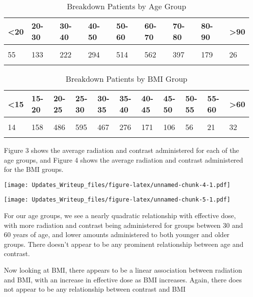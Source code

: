 \documentclass[]{article}
\begin{document}
\begin{table}[H] \centering 
  \caption{Breakdown Patients by Age Group} 
\begin{tabular}{p{1cm}p{1cm}p{1cm}p{1cm}p{1cm}p{1cm}p{1cm}p{1cm}p{1cm}}
\\[-1.8ex] \hline 
\hline
 <20 & 20-30 & 30-40 & 40-50& 50-60 & 60-70 & 70-80 & 80-90 & >90 \\ 
 \hline \\[-1.8ex] 
55 & 133 & 222 & 294 & 514 & 562 & 397 & 179 & 26 \\
\hline 
\hline \\[-1.8ex]
 \end{tabular}
\end{table}

\begin{table}[H] \centering 
  \caption{Breakdown Patients by BMI Group} 
\begin{tabular}{p{1cm}p{1cm}p{1cm}p{1cm}p{1cm}p{1cm}p{1cm}p{1cm}p{1cm}p{1cm}p{1cm}}
\\[-1.8ex] \hline 
\hline
 <15 & 15-20 & 20-25 & 25-30 & 30-35 & 35-40 & 40-45 & 45-50 & 50-55 & 55-60 & >60 \\ 
 \hline \\[-1.8ex] 
14 & 158 & 486 & 595 & 467 & 276 & 171 & 106 & 56 & 21 & 32 \\
\hline 
\hline \\[-1.8ex]
 \end{tabular}
\end{table}

Figure 3 shows the average radiation and contrast administered for each
of the age groups, and Figure 4 shows the average radiation and contrast
administered for the BMI groups.

\texttt{[image: Updates\_Writeup\_files/figure-latex/unnamed-chunk-4-1.pdf]}

\texttt{[image: Updates\_Writeup\_files/figure-latex/unnamed-chunk-5-1.pdf]}

For our age groups, we see a nearly quadratic relationship with
effective dose, with more radiation and contrast being administered for
groups between 30 and 60 years of age, and lower amounts administered to
both younger and older groups. There doesn't appear to be any prominent
relationship between age and contrast.

Now looking at BMI, there appears to be a linear association between
radiation and BMI, with an increase in effective dose as BMI increases.
Again, there does not appear to be any relationship between contrast and
BMI
\end{document}
